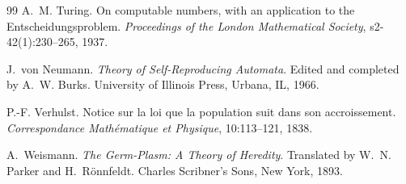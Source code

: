 \documentclass[11pt]{article}
\theoremstyle{plain}
\theoremstyle{definition}
\theoremstyle{remark}
\begin{document}
\begin{thebibliography}{99}
A.~M. Turing.
\newblock On computable numbers, with an application to the
  Entscheidungsproblem.
\newblock \emph{Proceedings of the London Mathematical Society},
  s2-42(1):230--265, 1937.

J.~von Neumann.
\newblock \emph{Theory of Self-Reproducing Automata}.
\newblock Edited and completed by A.~W. Burks. University of Illinois Press,
  Urbana, IL, 1966.

P.-F. Verhulst.
\newblock Notice sur la loi que la population suit dans son accroissement.
\newblock \emph{Correspondance Math\'ematique et Physique}, 10:113--121, 1838.

A.~Weismann.
\newblock \emph{The Germ-Plasm: A Theory of Heredity}.
\newblock Translated by W.~N. Parker and H.~R\"onnfeldt. Charles Scribner's
  Sons, New York, 1893.

\end{thebibliography}
\end{document}
